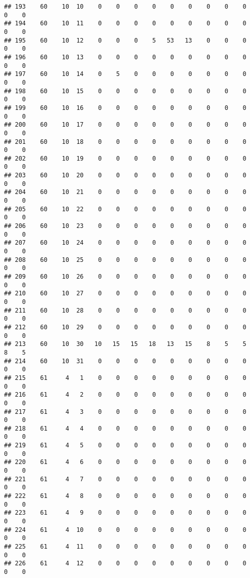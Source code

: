 \documentclass[]{article}
\begin{document}
\begin{verbatim}
## 193    60    10  10    0    0    0    0    0    0    0    0    0    0    0
## 194    60    10  11    0    0    0    0    0    0    0    0    0    0    0
## 195    60    10  12    0    0    0    5   53   13    0    0    0    0    0
## 196    60    10  13    0    0    0    0    0    0    0    0    0    0    0
## 197    60    10  14    0    5    0    0    0    0    0    0    0    0    0
## 198    60    10  15    0    0    0    0    0    0    0    0    0    0    0
## 199    60    10  16    0    0    0    0    0    0    0    0    0    0    0
## 200    60    10  17    0    0    0    0    0    0    0    0    0    0    0
## 201    60    10  18    0    0    0    0    0    0    0    0    0    0    0
## 202    60    10  19    0    0    0    0    0    0    0    0    0    0    0
## 203    60    10  20    0    0    0    0    0    0    0    0    0    0    0
## 204    60    10  21    0    0    0    0    0    0    0    0    0    0    0
## 205    60    10  22    0    0    0    0    0    0    0    0    0    0    0
## 206    60    10  23    0    0    0    0    0    0    0    0    0    0    0
## 207    60    10  24    0    0    0    0    0    0    0    0    0    0    0
## 208    60    10  25    0    0    0    0    0    0    0    0    0    0    0
## 209    60    10  26    0    0    0    0    0    0    0    0    0    0    0
## 210    60    10  27    0    0    0    0    0    0    0    0    0    0    0
## 211    60    10  28    0    0    0    0    0    0    0    0    0    0    0
## 212    60    10  29    0    0    0    0    0    0    0    0    0    0    0
## 213    60    10  30   10   15   15   18   13   15    8    5    5    8    5
## 214    60    10  31    0    0    0    0    0    0    0    0    0    0    0
## 215    61     4   1    0    0    0    0    0    0    0    0    0    0    0
## 216    61     4   2    0    0    0    0    0    0    0    0    0    0    0
## 217    61     4   3    0    0    0    0    0    0    0    0    0    0    0
## 218    61     4   4    0    0    0    0    0    0    0    0    0    0    0
## 219    61     4   5    0    0    0    0    0    0    0    0    0    0    0
## 220    61     4   6    0    0    0    0    0    0    0    0    0    0    0
## 221    61     4   7    0    0    0    0    0    0    0    0    0    0    0
## 222    61     4   8    0    0    0    0    0    0    0    0    0    0    0
## 223    61     4   9    0    0    0    0    0    0    0    0    0    0    0
## 224    61     4  10    0    0    0    0    0    0    0    0    0    0    0
## 225    61     4  11    0    0    0    0    0    0    0    0    0    0    0
## 226    61     4  12    0    0    0    0    0    0    0    0    0    0    0

\end{verbatim}
\end{document}
